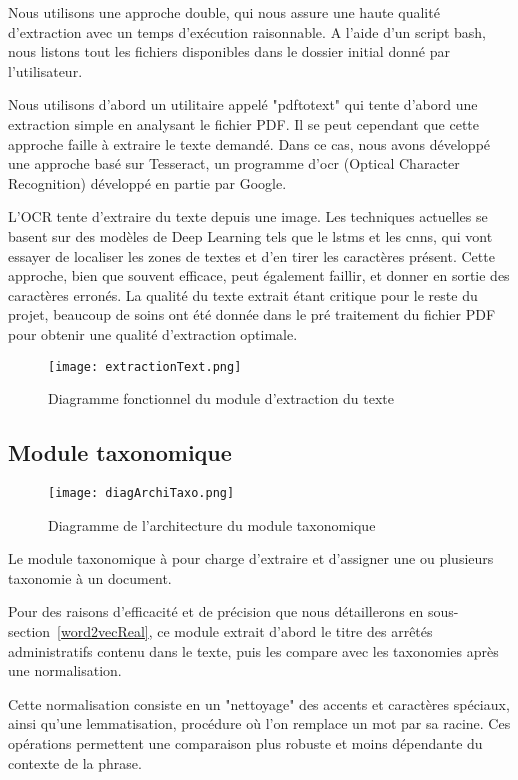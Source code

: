 Nous utilisons une approche double, qui nous assure une haute qualité d'extraction avec un temps d'exécution raisonnable.
A l'aide d'un script bash, nous listons tout les fichiers disponibles dans le dossier initial donné par l'utilisateur. 

Nous utilisons d'abord un utilitaire appelé "pdftotext" qui tente d'abord une extraction simple en analysant le fichier PDF. Il se peut cependant que cette approche faille à extraire le texte demandé. Dans ce cas, nous avons développé une approche basé sur Tesseract\cite{tess}, un programme d'\gls{ocr} (Optical Character Recognition) développé en partie par Google. 

L'OCR tente d'extraire du texte depuis une image. Les techniques actuelles se basent sur des modèles de Deep Learning tels que le \glspl{lstm} et les \glspl{cnn}, qui vont essayer de localiser les zones de textes et d'en tirer les caractères présent.
Cette approche, bien que souvent efficace, peut également faillir, et donner en sortie des caractères erronés. La qualité du texte extrait étant critique pour le reste du projet, beaucoup de soins ont été donnée dans le pré traitement du fichier PDF pour obtenir une qualité d'extraction optimale.

\begin{figure}[h!]
  \centering
	\texttt{[image: extractionText.png]}
	\caption[]{Diagramme fonctionnel du module d'extraction du texte}
  \label{}
\end{figure}


\subsection{Module taxonomique}

\begin{figure}[h!]
  \centering
  \texttt{[image: diagArchiTaxo.png]}
	\caption[]{Diagramme de l'architecture du module taxonomique}
  \label{}
\end{figure}

Le module taxonomique à pour charge d'extraire et d'assigner une ou plusieurs taxonomie à un document.

Pour des raisons d'efficacité et de précision que nous détaillerons en sous-section~\ref{word2vecReal}, ce module extrait d'abord le titre des arrêtés administratifs contenu dans le texte, puis les compare avec les taxonomies après une normalisation.

Cette normalisation consiste en un "nettoyage" des accents et caractères spéciaux, ainsi qu'une lemmatisation, procédure où l'on remplace un mot par sa racine.
Ces opérations permettent une comparaison plus robuste et moins dépendante du contexte de la phrase. 

